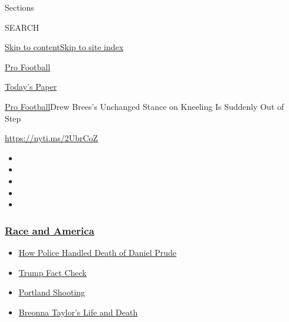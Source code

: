 Sections

SEARCH

\protect\hyperlink{site-content}{Skip to
content}\protect\hyperlink{site-index}{Skip to site index}

\href{https://www.nytimes3xbfgragh.onion/section/sports/football}{Pro
Football}

\href{https://myaccount.nytimes3xbfgragh.onion/auth/login?response_type=cookie\&client_id=vi}{}

\href{https://www.nytimes3xbfgragh.onion/section/todayspaper}{Today's
Paper}

\href{/section/sports/football}{Pro Football}\textbar{}Drew Brees's
Unchanged Stance on Kneeling Is Suddenly Out of Step

\url{https://nyti.ms/2UbrCoZ}

\begin{itemize}
\item
\item
\item
\item
\item
\end{itemize}

\hypertarget{race-and-america}{%
\subsubsection{\texorpdfstring{\href{https://www.nytimes3xbfgragh.onion/news-event/george-floyd-protests-minneapolis-new-york-los-angeles?name=styln-george-floyd\&region=TOP_BANNER\&block=storyline_menu_recirc\&action=click\&pgtype=Article\&impression_id=b4da16d0-f1ce-11ea-bdd2-7fcbbccad7d5\&variant=undefined}{Race
and America}}{Race and America}}\label{race-and-america}}

\begin{itemize}
\tightlist
\item
  \href{https://www.nytimes3xbfgragh.onion/2020/09/04/nyregion/rochester-police-daniel-prude.html?name=styln-george-floyd\&region=TOP_BANNER\&block=storyline_menu_recirc\&action=click\&pgtype=Article\&impression_id=b4da3de0-f1ce-11ea-bdd2-7fcbbccad7d5\&variant=undefined}{How
  Police Handled Death of Daniel Prude}
\item
  \href{https://www.nytimes3xbfgragh.onion/2020/09/01/us/politics/trump-fact-check-protests.html?name=styln-george-floyd\&region=TOP_BANNER\&block=storyline_menu_recirc\&action=click\&pgtype=Article\&impression_id=b4da3de1-f1ce-11ea-bdd2-7fcbbccad7d5\&variant=undefined}{Trump
  Fact Check}
\item
  \href{https://www.nytimes3xbfgragh.onion/2020/08/30/us/portland-shooting-explained.html?name=styln-george-floyd\&region=TOP_BANNER\&block=storyline_menu_recirc\&action=click\&pgtype=Article\&impression_id=b4da3de2-f1ce-11ea-bdd2-7fcbbccad7d5\&variant=undefined}{Portland
  Shooting}
\item
  \href{https://www.nytimes3xbfgragh.onion/2020/08/30/us/breonna-taylor-police-killing.html?name=styln-george-floyd\&region=TOP_BANNER\&block=storyline_menu_recirc\&action=click\&pgtype=Article\&impression_id=b4da3de3-f1ce-11ea-bdd2-7fcbbccad7d5\&variant=undefined}{Breonna
  Taylor's Life and Death}
\end{itemize}

